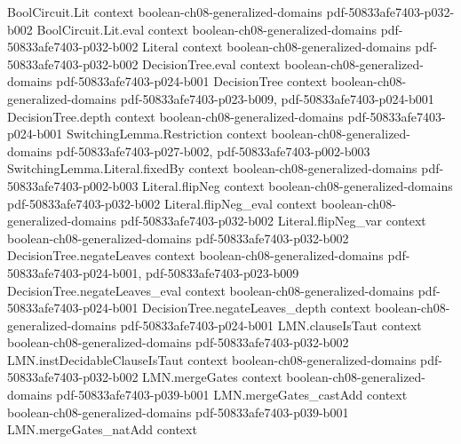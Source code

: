 \begin{lemma}
\label{BooleanAnalysis.card_walsh_characters}
\leanok
{}
\proofstep
  {BoolCircuit.Lit}
  {context}
  {boolean-ch08-generalized-domains}
  {pdf-50833afe7403-p032-b002}
\proofstep
  {BoolCircuit.Lit.eval}
  {context}
  {boolean-ch08-generalized-domains}
  {pdf-50833afe7403-p032-b002}
\proofstep
  {Literal}
  {context}
  {boolean-ch08-generalized-domains}
  {pdf-50833afe7403-p032-b002}
\proofstep
  {DecisionTree.eval}
  {context}
  {boolean-ch08-generalized-domains}
  {pdf-50833afe7403-p024-b001}
\proofstep
  {DecisionTree}
  {context}
  {boolean-ch08-generalized-domains}
  {pdf-50833afe7403-p023-b009,
    pdf-50833afe7403-p024-b001}
\proofstep
  {DecisionTree.depth}
  {context}
  {boolean-ch08-generalized-domains}
  {pdf-50833afe7403-p024-b001}
\proofstep
  {SwitchingLemma.Restriction}
  {context}
  {boolean-ch08-generalized-domains}
  {pdf-50833afe7403-p027-b002,
    pdf-50833afe7403-p002-b003}
\proofstep
  {SwitchingLemma.Literal.fixedBy}
  {context}
  {boolean-ch08-generalized-domains}
  {pdf-50833afe7403-p002-b003}
\proofstep
  {Literal.flipNeg}
  {context}
  {boolean-ch08-generalized-domains}
  {pdf-50833afe7403-p032-b002}
\proofstep
  {Literal.flipNeg_eval}
  {context}
  {boolean-ch08-generalized-domains}
  {pdf-50833afe7403-p032-b002}
\proofstep
  {Literal.flipNeg_var}
  {context}
  {boolean-ch08-generalized-domains}
  {pdf-50833afe7403-p032-b002}
\proofstep
  {DecisionTree.negateLeaves}
  {context}
  {boolean-ch08-generalized-domains}
  {pdf-50833afe7403-p024-b001,
    pdf-50833afe7403-p023-b009}
\proofstep
  {DecisionTree.negateLeaves_eval}
  {context}
  {boolean-ch08-generalized-domains}
  {pdf-50833afe7403-p024-b001}
\proofstep
  {DecisionTree.negateLeaves_depth}
  {context}
  {boolean-ch08-generalized-domains}
  {pdf-50833afe7403-p024-b001}
\proofstep
  {LMN.clauseIsTaut}
  {context}
  {boolean-ch08-generalized-domains}
  {pdf-50833afe7403-p032-b002}
\proofstep
  {LMN.instDecidableClauseIsTaut}
  {context}
  {boolean-ch08-generalized-domains}
  {pdf-50833afe7403-p032-b002}
\proofstep
  {LMN.mergeGates}
  {context}
  {boolean-ch08-generalized-domains}
  {pdf-50833afe7403-p039-b001}
\proofstep
  {LMN.mergeGates_castAdd}
  {context}
  {boolean-ch08-generalized-domains}
  {pdf-50833afe7403-p039-b001}
\proofstep
  {LMN.mergeGates_natAdd}
  {context}

\end{lemma}
